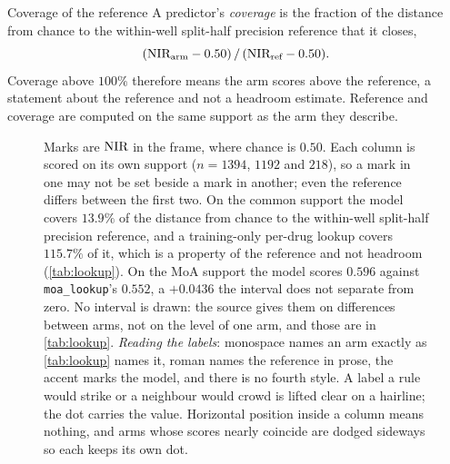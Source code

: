 \begin{defn}{Coverage of the reference}
A predictor's \emph{coverage} is the fraction of the distance from chance to the
within-well split-half precision reference that it closes,
\[
  (\textrm{NIR}_{\text{arm}} - 0.50)\,/\,(\textrm{NIR}_{\text{ref}} - 0.50).
\]
Coverage above $100\%$ therefore means the arm scores above the reference, a
statement about the reference and not a headroom estimate. Reference and coverage
are computed on the same support as the arm they describe.
\end{defn}

\begin{figure}[htbp]
\begin{fullwidth}
\centering

\caption[The baseline ladder]{ Marks are $\textrm{NIR}$ in the \Rframe{}
frame, where chance is $0.50$. Each column is scored on its own support
($n = \num{1394}$, $\num{1192}$ and $\num{218}$), so a mark in one may not be set
beside a mark in another; even the reference differs between the first two. On
the common support the model covers $13.9\%$ of the distance from chance to the
within-well split-half precision reference, and a training-only per-drug lookup
covers $115.7\%$ of it, which is a property of the reference and not headroom
(\cref{tab:lookup}). On the MoA support the model scores $0.596$ against
\texttt{moa\_lookup}'s $0.552$, a $+0.0436$ the interval does not separate from
zero. No interval is drawn: the source gives them on differences between arms,
not on the level of one arm, and those are in \cref{tab:lookup}. \emph{Reading
the labels}: monospace names an arm exactly as \cref{tab:lookup} names it, roman
names the reference in prose, the accent marks the model, and there is no fourth
style. A label a rule would strike or a neighbour would crowd is lifted clear on
a hairline; the dot carries the value. Horizontal position inside a column means
nothing, and arms whose scores nearly coincide are dodged sideways so each keeps
its own dot.}
\label{fig:ladder}
\end{fullwidth}
\end{figure}

